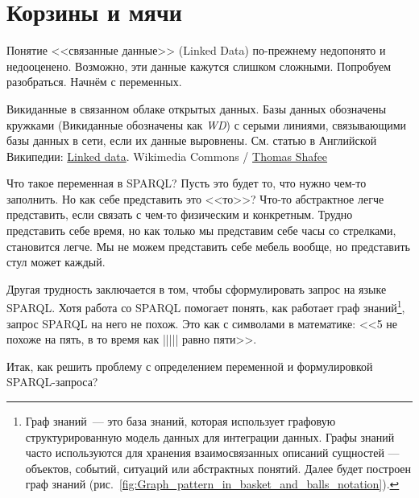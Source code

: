 \chapter{Корзины и мячи}
\label{ch:BucketsAndBalls}


Понятие <<связанные данные>> (Linked Data) по-прежнему недопонято и недооценено. Возможно, эти данные кажутся слишком сложными. 
Попробуем разобраться. Начнём с переменных.

\begin{marginfigure}[0cm]
	{
		\setlength{\fboxsep}{0pt}%
		\setlength{\fboxrule}{1pt}%
	}
    \caption[Викиданные в связанном облаке открытых данных]{Викиданные в связанном облаке открытых данных. Базы данных обозначены кружками (Викиданные обозначены как \textit{WD}) с серыми линиями, связывающими базы данных в сети, если их данные выровнены. См. статью в Английской Википедии: \href{https://en.wikipedia.org/wiki/Linked_data}{Linked data}. Wikimedia Commons / \href{https://commons.wikimedia.org/wiki/File:Wikidata_in_the_Linked_Open_Data_cloud_2020-08-20.svg}{Thomas Shafee}}
	\label{fig:Wikidata_in_linked_open_data}
\end{marginfigure}

Что такое переменная в SPARQL? Пусть это будет то, что нужно чем-то заполнить. Но как себе представить это <<то>>? Что-то абстрактное легче представить, если связать с чем-то физическим и конкретным. Трудно представить себе время, но как только мы представим себе часы со стрелками, становится легче. Мы не можем представить себе мебель вообще, но представить стул может каждый.

Другая трудность заключается в том, чтобы сформулировать запрос на языке SPARQL. Хотя работа со SPARQL помогает понять, как работает граф знаний\footnote[][12pt]{ Граф знаний~--- это база знаний, которая использует графовую структурированную модель данных для интеграции данных. Графы знаний часто используются для хранения взаимосвязанных описаний сущностей — объектов, событий, ситуаций или абстрактных понятий. Далее будет построен граф знаний (рис.~\ref{fig:Graph_pattern_in_basket_and_balls_notation}).}, запрос SPARQL на него не похож. Это как с символами в математике: <<5 не похоже на пять, в то время как ||||| равно пяти>>.

Итак, как решить проблему с определением переменной и формулировкой SPARQL-запроса?

